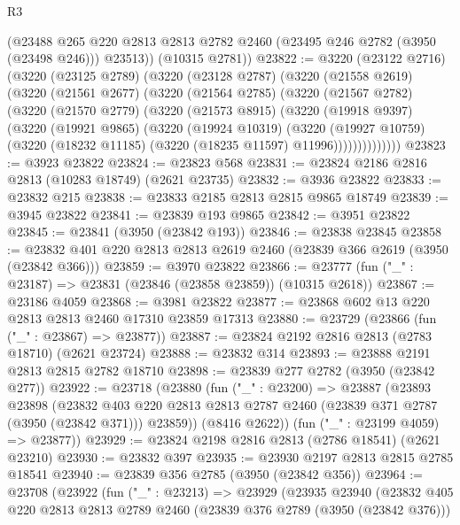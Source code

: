 \begin{lexlean}{R3}
\begin{coremodule}
        (@23488 @265 @220 @2813 @2813 @2782 @2460 (@23495 @246 @2782 (@3950 (@23498 @246))) @23513))
      (@10315 @2781))
@23822 := @3220
    (@23122 @2716)
    (@3220
      (@23125 @2789)
      (@3220
        (@23128 @2787)
        (@3220
          (@21558 @2619)
          (@3220
            (@21561 @2677)
            (@3220
              (@21564 @2785)
              (@3220
                (@21567 @2782)
                (@3220
                  (@21570 @2779)
                  (@3220
                    (@21573 @8915)
                    (@3220
                      (@19918 @9397)
                      (@3220
                        (@19921 @9865)
                        (@3220
                          (@19924 @10319)
                          (@3220
                            (@19927 @10759)
                            (@3220 (@18232 @11185) (@3220 (@18235 @11597) @11996))))))))))))))
@23823 := @3923 @23822
@23824 := @23823 @568
@23831 := @23824 @2186 @2816 @2813 (@10283 @18749) (@2621 @23735)
@23832 := @3936 @23822
@23833 := @23832 @215
@23838 := @23833 @2185 @2813 @2815 @9865 @18749
@23839 := @3945 @23822
@23841 := @23839 @193 @9865
@23842 := @3951 @23822
@23845 := @23841 (@3950 (@23842 @193))
@23846 := @23838 @23845
@23858 := @23832 @401 @220 @2813 @2813 @2619 @2460 (@23839 @366 @2619 (@3950 (@23842 @366)))
@23859 := @3970 @23822
@23866 := @23777 (fun ("_" : @23187) => @23831 (@23846 (@23858 @23859)) (@10315 @2618))
@23867 := @23186 @4059
@23868 := @3981 @23822
@23877 := @23868 @602 @13 @220 @2813 @2813 @2460 @17310 @23859 @17313
@23880 := @23729 (@23866 (fun ("_" : @23867) => @23877))
@23887 := @23824 @2192 @2816 @2813 (@2783 @18710) (@2621 @23724)
@23888 := @23832 @314
@23893 := @23888 @2191 @2813 @2815 @2782 @18710
@23898 := @23839 @277 @2782 (@3950 (@23842 @277))
@23922 := @23718
    (@23880
      (fun ("_" : @23200) =>
      @23887
        (@23893
          @23898
          (@23832
            @403
            @220
            @2813
            @2813
            @2787
            @2460
            (@23839 @371 @2787 (@3950 (@23842 @371)))
            @23859))
        (@8416 @2622))
      (fun ("_" : @23199 @4059) => @23877))
@23929 := @23824 @2198 @2816 @2813 (@2786 @18541) (@2621 @23210)
@23930 := @23832 @397
@23935 := @23930 @2197 @2813 @2815 @2785 @18541
@23940 := @23839 @356 @2785 (@3950 (@23842 @356))
@23964 := @23708
    (@23922
      (fun ("_" : @23213) =>
      @23929
        (@23935
          @23940
          (@23832
            @405
            @220
            @2813
            @2813
            @2789
            @2460
            (@23839 @376 @2789 (@3950 (@23842 @376)))

\end{coremodule}
\end{lexlean}

